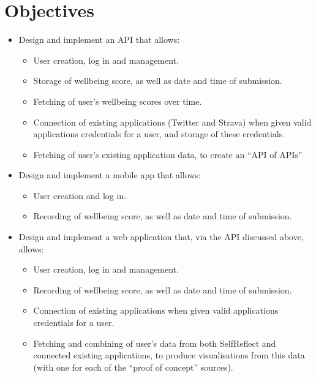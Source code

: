 \documentclass[11pt,openright,a4paper]{report}
\begin{document}
\section{Objectives} \label{objectives}
\begin{itemize}

\item Design and implement an API that allows:
\begin{itemize}
  \item User creation, log in and management.
  \item Storage of wellbeing score, as well as date and time of submission.
  \item Fetching of user's wellbeing scores over time.
  \item Connection of existing applications (Twitter and Strava) when given valid applications credentials for a user, and storage of these credentials.
  \item Fetching of user's existing application data, to create an \enquote{API of APIs}
\end{itemize} 
  
\item Design and implement a mobile app that allows:
\begin{itemize}
  \item User creation and log in.
  \item Recording of wellbeing score, as well as date and time of submission.
\end{itemize}

\item Design and implement a web application that, via the API discussed above, allows:
\begin{itemize}
  \item User creation, log in and management.
  \item Recording of wellbeing score, as well as date and time of submission.
  \item Connection of existing applications when given valid applications credentials for a user.
  \item Fetching and combining of user's data from both SelfReflect and connected existing applications, to produce visualisations from this data (with one for each of the \enquote{proof of concept} sources).
\end{itemize} 


\end{itemize}
\end{document}
